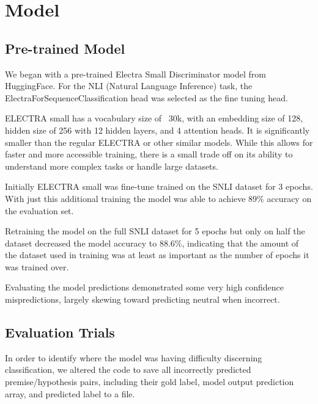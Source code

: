 \documentclass[11pt]{article}
\begin{document}
\section{Model}
\subsection{Pre-trained Model}

We began with a pre-trained Electra Small Discriminator model from HuggingFace. For the NLI (Natural Language Inference) task, the ElectraForSequenceClassification head was selected as the fine tuning head.

ELECTRA small has a vocabulary size of ~30k, with an embedding size of 128, hidden size of 256 with 12 hidden layers, and 4 attention heads.  It is significantly smaller than the regular ELECTRA or other similar models. While this allows for faster and more accessible training, there is a small trade off on its ability to understand more complex tasks or handle large datasets.

Initially ELECTRA small was fine-tune trained on the SNLI dataset for 3 epochs. With just this additional training the model was able to achieve 89\% accuracy on the evaluation set. 

Retraining the model on the full SNLI dataset for 5 epochs but only on half the dataset decreased the model accuracy to 88.6\%, indicating that the amount of the dataset used in training was at least as important as the number of epochs it was trained over.  

Evaluating the model predictions demonstrated some very high confidence mispredictions, largely skewing toward predicting neutral when incorrect.

\subsection{Evaluation Trials}
In order to identify where the model was having difficulty discerning classification, we altered the code to save all incorrectly predicted premise/hypothesis pairs, including their gold label, model output prediction array, and predicted label to a file.
\end{document}
